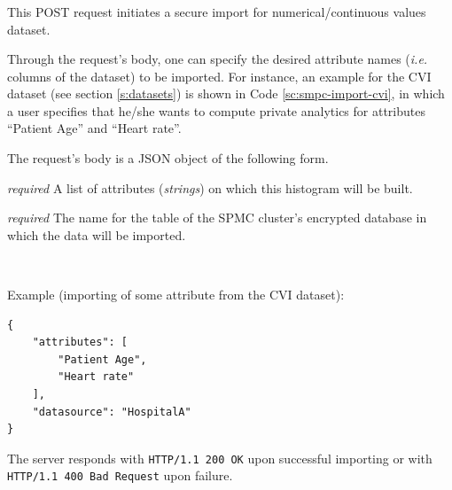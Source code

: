 \subsubsection[/smpc/import/numerical POST request]{\protect{}}\label{sss:post4}
This POST request initiates a secure import for numerical/continuous values dataset.
\begin{description}[labelwidth=5em, leftmargin=\dimexpr\labelwidth+\labelsep\relax]
\item[Request:] Through the request's body, one can specify the desired attribute names (\textit{i.e.} columns of the dataset) to be imported.
For instance, an example for the CVI dataset (see section \ref{s:datasets}) is shown in Code \ref{sc:smpc-import-cvi}, in which a user specifies that he/she wants to compute private analytics for attributes ``Patient Age'' and ``Heart rate''.

The request's body is a JSON object of the following form.

\begin{description}[labelwidth=6em, leftmargin=\dimexpr\labelwidth+\labelsep\relax]

    \item[\texttt{attributes}:] {\color{red}\textit{required}} A list of attributes (\textit{strings}) on which this histogram will be built.

    \item[\texttt{datasource}:] {\color{red}\textit{required}} The name for the table of the SPMC cluster's encrypted database in which the data  will be imported.

\end{description}

\ \\
\begin{minipage}{\linewidth}
  Example (importing of some attribute from the CVI dataset):\\
{
\begin{verbatim}
{
    "attributes": [
        "Patient Age",
        "Heart rate"
    ],
    "datasource": "HospitalA"
}
\end{verbatim}
\label{sc:smpc-import-cvi}
}
\end{minipage}


\item[Response:] The server responds with \texttt{HTTP/1.1 200 OK} upon successful importing or with \texttt{HTTP/1.1 400 Bad Request} upon failure.
\end{description}


